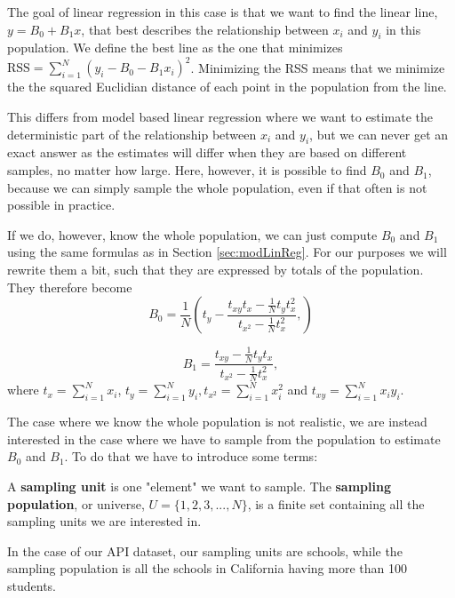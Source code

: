 \documentclass{article}
\begin{document}
The goal of linear regression in this case is that we want to find the linear
line, \(y = B_0 + B_1x\), that best describes the relationship between \(x_i\)
and \(y_i\) in this population. We define the best line as the one
that minimizes \(\mathrm{RSS} = \sum_{i = 1}^N (y_i - B_0 - B_1 x_i)^2\).
Minimizing the RSS means that we minimize the the squared Euclidian distance of each point
in the population from the line.

This differs from model based linear regression where we want to estimate the
deterministic part of the relationship between \(x_i\) and \(y_i\), but we can
never get an exact answer as the estimates will differ when they are based on
different samples, no matter how large. Here, however, it is possible to find \(B_0\) and
\(B_1\), because we can simply sample the whole population, even if that often
is not possible in practice.

If we do, however, know the whole population, we can just compute \(B_0\) and \(B_1\) using the same formulas
as in Section \ref{sec:modLinReg}. For our purposes we will rewrite them a bit,
such that they are expressed by totals of the population. They therefore become
\begin{equation*}
 B_0 = \frac{1}{N} \left( t_y - \frac{t_{xy} t_x - \frac{1}{N} t_y t_x^2}
   {t_{x^2} - \frac{1}{N} t_x^2},
  \right)
\end{equation*}

\begin{equation*}
 B_1 = \frac{t_{xy} - \frac{1}{N} t_y t_x}
   {t_{x^2} - \frac{1}{N} t_x^2},
\end{equation*}
where \(t_x = \sum_{i = 1}^N x_i\), \(t_y = \sum_{i = 1}^N y_i, t_{x^2} =
\sum_{i = 1}^N x_i^2\) and \(t_{xy} =
\sum_{i = 1}^N x_i y_i\).

The case where we know the whole population is not realistic, we are instead interested in the case where we have to sample from the
population to estimate \(B_0\) and \(B_1\). To do that we have to introduce some terms:


\begin{definition} \label{def:sampUnitPop}
 A \textbf{sampling unit} is one "element" we want to sample.
 The \textbf{sampling population}, or universe, \(U = \{1, 2, 3, ..., N\}\), is a
 finite set containing all the sampling units we are interested in.
\end{definition}

In the case of our API dataset, our sampling units are schools, while
the sampling population is all the schools in California having more than 100 students.
\end{document}
